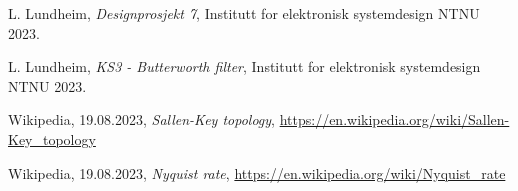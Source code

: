 
  L. Lundheim,
  \emph{Designprosjekt 7},
  Institutt for elektronisk systemdesign NTNU
  2023.

  L. Lundheim,
  \emph{KS3 - Butterworth filter},
  Institutt for elektronisk systemdesign NTNU
  2023.

  Wikipedia, 19.08.2023, 
  \emph{Sallen-Key topology},
  \url{https://en.wikipedia.org/wiki/Sallen-Key_topology}

  Wikipedia, 19.08.2023, 
  \emph{Nyquist rate},
  \url{https://en.wikipedia.org/wiki/Nyquist_rate}

